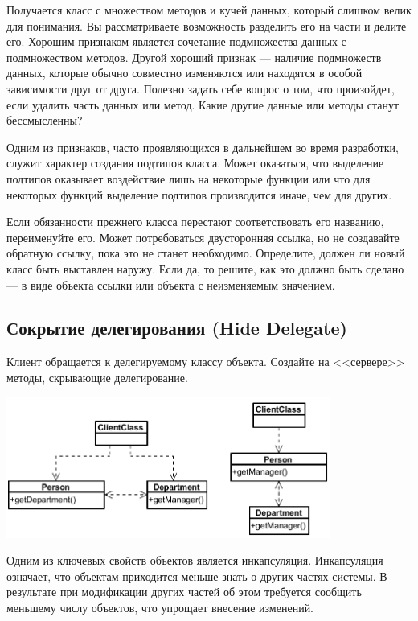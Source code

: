 \documentclass{../../text-style}
\begin{document}
Получается класс с множеством методов и кучей данных, который слишком велик для понимания. Вы рассматриваете возможность разделить его на части и делите его. Хорошим признаком является сочетание подмножества данных с подмножеством методов. Другой хороший признак --- наличие подмножеств данных, которые обычно совместно изменяются или находятся в особой зависимости друг от друга. Полезно задать себе вопрос о том, что произойдет, если удалить часть данных или метод. Какие другие данные или методы станут бессмысленны?

Одним из признаков, часто проявляющихся в дальнейшем во время разработки, служит характер создания подтипов класса. Может оказаться, что выделение подтипов оказывает воздействие лишь на некоторые функции или что для некоторых функций выделение подтипов производится иначе, чем для других.

Если обязанности прежнего класса перестают соответствовать его названию, переименуйте его. Может потребоваться двусторонняя ссылка, но не создавайте обратную ссылку, пока это не станет необходимо. Определите, должен ли новый класс быть выставлен наружу. Если да, то решите, как это должно быть сделано --- в виде объекта ссылки или объекта с неизменяемым значением.

\subsection{Сокрытие делегирования (Hide Delegate)}

Клиент обращается к делегируемому классу объекта. Создайте на <<сервере>> методы, скрывающие делегирование.

\begin{center}
    \includegraphics[width=0.8\textwidth]{hideDelegate.png}
\end{center}

Одним из ключевых свойств объектов является инкапсуляция. Инкапсуляция означает, что объектам приходится меньше знать о других частях системы. В результате при модификации других частей об этом требуется сообщить меньшему числу объектов, что упрощает внесение изменений.
\end{document}
